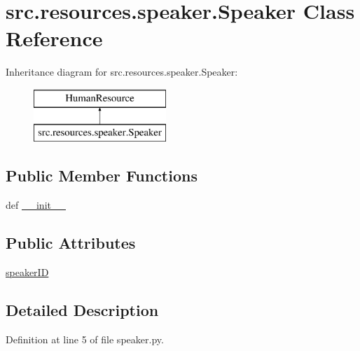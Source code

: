 \hypertarget{classsrc_1_1resources_1_1speaker_1_1_speaker}{\section{src.\+resources.\+speaker.\+Speaker Class Reference}
\label{classsrc_1_1resources_1_1speaker_1_1_speaker}
}
Inheritance diagram for src.\+resources.\+speaker.\+Speaker\+:\begin{figure}[H]
\begin{center}
\leavevmode
\includegraphics[height=2.000000cm]{classsrc_1_1resources_1_1speaker_1_1_speaker}
\end{center}
\end{figure}
\subsection*{Public Member Functions}
\begin{DoxyCompactItemize}
\item 
def \hyperlink{classsrc_1_1resources_1_1speaker_1_1_speaker_a019f0817887d4145fc13f4696a4f8baa}{\+\_\+\+\_\+init\+\_\+\+\_\+}
\end{DoxyCompactItemize}
\subsection*{Public Attributes}
\begin{DoxyCompactItemize}
\item 
\hyperlink{classsrc_1_1resources_1_1speaker_1_1_speaker_abe55b033660bc93fd7400f01a996a2dc}{speaker\+I\+D}
\end{DoxyCompactItemize}


\subsection{Detailed Description}


Definition at line 5 of file speaker.\+py.



